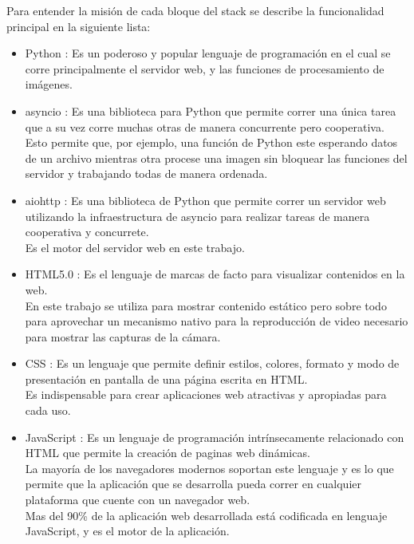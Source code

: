    Para entender la misión de cada bloque del stack se describe la funcionalidad principal en la siguiente lista:
   \begin{itemize}
      \item{Python \citep{WEBSITE:python}: Es un poderoso y popular lenguaje de programación en el cual se corre principalmente el servidor web, y las funciones de procesamiento de imágenes.
      }
      \item{asyncio \citep{WEBSITE:asyncio}: Es una biblioteca para Python que permite correr una única tarea que a su vez corre muchas otras de manera concurrente pero cooperativa. \\
      Esto permite que, por ejemplo, una función de Python este esperando datos de un archivo mientras otra procese una imagen sin bloquear las funciones del servidor y trabajando todas de manera ordenada.
      }
      \item{aiohttp \citep{WEBSITE:aiohttp}: Es una biblioteca de Python que permite correr un servidor web utilizando la infraestructura de asyncio para realizar tareas de manera cooperativa y concurrete.\\
      Es el motor del servidor web en este trabajo.
      }
      \item{HTML5.0 \citep{WEBSITE:html5}: Es el lenguaje de marcas de facto para visualizar contenidos en la web.\\
         En este trabajo se utiliza para mostrar contenido estático pero sobre todo para aprovechar un mecanismo nativo para la reproducción de video necesario para mostrar las capturas de la cámara. \\
      }
      \item{CSS \citep{WEBSITE:css}: Es un lenguaje que permite definir estilos, colores, formato y modo de presentación en pantalla de una página escrita en HTML.\\
      Es indispensable para crear aplicaciones web atractivas y apropiadas para cada uso.
      }
      \item{JavaScript \citep{WEBSITE:javascript}: Es un lenguaje de programación intrínsecamente relacionado con HTML que permite la creación de paginas web dinámicas.\\
         La mayoría de los navegadores modernos soportan este lenguaje y es lo que permite que la aplicación que se desarrolla pueda correr en cualquier plataforma que cuente con un navegador web. \\
         Mas del 90\% de la aplicación web desarrollada está codificada en lenguaje JavaScript, y es el motor de la aplicación. \\
}
\end{itemize}
